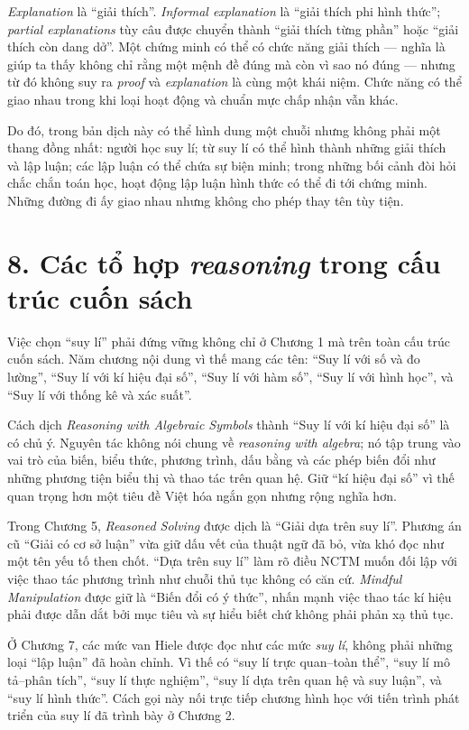\emph{Explanation} là ``giải thích''. \emph{Informal explanation} là ``giải thích phi hình thức''; \emph{partial explanations} tùy câu được chuyển thành ``giải thích từng phần'' hoặc ``giải thích còn dang dở''. Một chứng minh có thể có chức năng giải thích --- nghĩa là giúp ta thấy không chỉ rằng một mệnh đề đúng mà còn vì sao nó đúng --- nhưng từ đó không suy ra \emph{proof} và \emph{explanation} là cùng một khái niệm. Chức năng có thể giao nhau trong khi loại hoạt động và chuẩn mực chấp nhận vẫn khác.

Do đó, trong bản dịch này có thể hình dung một chuỗi nhưng không phải một thang đồng nhất: người học suy lí; từ suy lí có thể hình thành những giải thích và lập luận; các lập luận có thể chứa sự biện minh; trong những bối cảnh đòi hỏi chắc chắn toán học, hoạt động lập luận hình thức có thể đi tới chứng minh. Những đường đi ấy giao nhau nhưng không cho phép thay tên tùy tiện.

\section*{8. Các tổ hợp \emph{reasoning} trong cấu trúc cuốn sách}

Việc chọn ``suy lí'' phải đứng vững không chỉ ở Chương 1 mà trên toàn cấu trúc cuốn sách. Năm chương nội dung vì thế mang các tên: ``Suy lí với số và đo lường'', ``Suy lí với kí hiệu đại số'', ``Suy lí với hàm số'', ``Suy lí với hình học'', và ``Suy lí với thống kê và xác suất''.

Cách dịch \emph{Reasoning with Algebraic Symbols} thành ``Suy lí với kí hiệu đại số'' là có chủ ý. Nguyên tác không nói chung về \emph{reasoning with algebra}; nó tập trung vào vai trò của biến, biểu thức, phương trình, dấu bằng và các phép biến đổi như những phương tiện biểu thị và thao tác trên quan hệ. Giữ ``kí hiệu đại số'' vì thế quan trọng hơn một tiêu đề Việt hóa ngắn gọn nhưng rộng nghĩa hơn.

Trong Chương 5, \emph{Reasoned Solving} được dịch là ``Giải dựa trên suy lí''. Phương án cũ ``Giải có cơ sở luận'' vừa giữ dấu vết của thuật ngữ đã bỏ, vừa khó đọc như một tên yếu tố then chốt. ``Dựa trên suy lí'' làm rõ điều NCTM muốn đối lập với việc thao tác phương trình như chuỗi thủ tục không có căn cứ. \emph{Mindful Manipulation} được giữ là ``Biến đổi có ý thức'', nhấn mạnh việc thao tác kí hiệu phải được dẫn dắt bởi mục tiêu và sự hiểu biết chứ không phải phản xạ thủ tục.

Ở Chương 7, các mức van Hiele được đọc như các mức \emph{suy lí}, không phải những loại ``lập luận'' đã hoàn chỉnh. Vì thế có ``suy lí trực quan--toàn thể'', ``suy lí mô tả--phân tích'', ``suy lí thực nghiệm'', ``suy lí dựa trên quan hệ và suy luận'', và ``suy lí hình thức''. Cách gọi này nối trực tiếp chương hình học với tiến trình phát triển của suy lí đã trình bày ở Chương 2.

